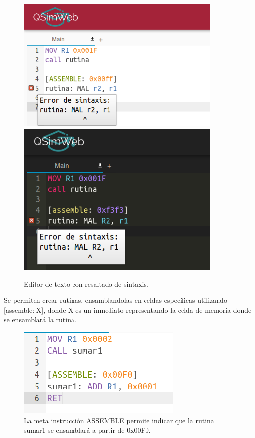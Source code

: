 \begin{figure}[H]
  \centering
  \includegraphics[width=10cm]{figuras/editor_errores.png}
  \includegraphics[width=10cm]{figuras/editor_errores_obscuro.png}
  \caption{Editor de texto con resaltado de sintaxis.}
  \label{fig:editor}
\end{figure}

Se permiten crear rutinas, ensamblandolas en celdas específicas utilizando [assemble: X], donde X es un inmediato representando la celda de memoria donde se ensamblará la rutina.
\begin{figure}[H]
  \centering
  \includegraphics[scale=0.6]{./figuras/ASSEMBLE.png}
  \caption*{La meta instrucción ASSEMBLE permite indicar que la rutina sumar1 se ensamblará a partir de 0x00F0.}
  \label{fig:ASSEMBLE}
\end{figure}

